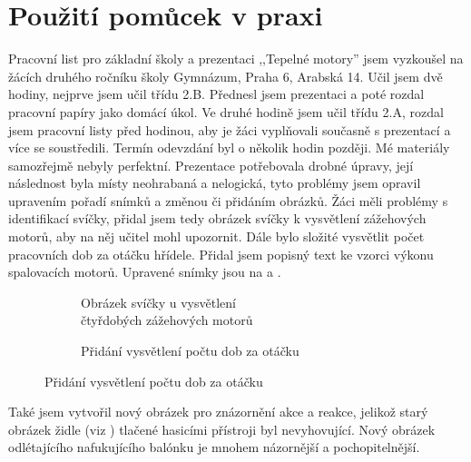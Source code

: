 \section{Použití pomůcek v praxi}\label{sc:pouzitiVPraxi}
{Pracovní list pro základní školy a prezentaci ,,Tepelné motory'' jsem vyzkoušel na žácích druhého ročníku školy Gymnázum, Praha 6, Arabská 14. Učil jsem dvě hodiny, nejprve jsem učil třídu 2.B. Přednesl jsem prezentaci a poté rozdal pracovní papíry jako domácí úkol. Ve druhé hodině jsem učil třídu 2.A, rozdal jsem pracovní listy před hodinou, aby je žáci vyplňovali současně s prezentací a více se soustředili. Termín odevzdání byl o několik hodin později.}\odst
{Mé materiály samozřejmě nebyly perfektní. Prezentace potřebovala drobné úpravy, její následnost byla místy neohrabaná a nelogická, tyto problémy jsem opravil upravením pořadí snímků a změnou či přidáním obrázků.}\odst
{Žáci měli problémy s identifikací svíčky, přidal jsem tedy obrázek svíčky k vysvětlení zážehových motorů, aby na něj učitel mohl upozornit. Dále bylo složité vysvětlit počet pracovních dob za otáčku hřídele. Přidal jsem popisný text ke vzorci výkonu spalovacích motorů. Upravené snímky jsou na  a .}
\begin{figure}[H]
    \begingroup
    \makeatletter
    \renewcommand\thesubfigure{\thefigure~--~\@nameuse{subfiglabel@\alph{subfigure}}}
    \newcommand{\subfiglabel@a}{vlevo}
    \newcommand{\subfiglabel@b}{vpravo}
    \captionsetup[subfigure]{labelformat=simple, labelsep=colon}
    \renewcommand\p@subfigure{}
    \makeatother
    \begin{subfigure}{0.47\textwidth}
        \centering
        \setlength{\fboxsep}{0pt}
        \caption{Obrázek svíčky u vysvětlení\\čtyřdobých zážehových motorů \jaObr}
        \label{obr:svickaSlide}
    \end{subfigure}\hfill
    \begin{subfigure}{0.47\textwidth}
        \centering
        \setlength{\fboxsep}{0pt}
        \caption{Přidání vysvětlení počtu dob za otáčku \jaObr}
        \label{obr:vzorceSlide}
    \end{subfigure}
    \endgroup
\end{figure}
{Také jsem vytvořil nový obrázek pro znázornění akce a reakce, jelikož starý obrázek židle (viz ) tlačené hasicími přístroji byl nevyhovující. Nový obrázek  odlétajícího nafukujícího balónku je mnohem názornější a pochopitelnější.}
